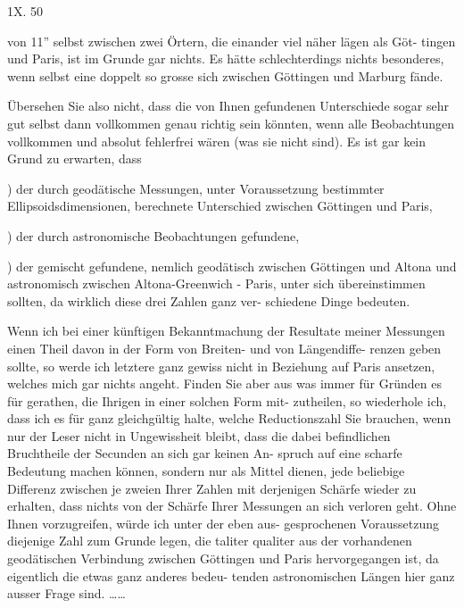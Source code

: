 \documentclass[12pt,a4paper]{article}
\theoremstyle{plain}
\theoremstyle{definition}
\theoremstyle{remark}
\begin{document}

\noindent
1X. 50

\noindent

\noindent
von 11'' selbst zwischen zwei Örtern, die einander viel näher lägen als Göt-
tingen und Paris, ist im Grunde gar nichts. Es hätte schlechterdings nichts
besonderes, wenn selbst eine doppelt so grosse sich zwischen Göttingen und
Marburg fände.

\noindent
Übersehen Sie also nicht, dass die von Ihnen gefundenen Unterschiede
sogar sehr gut selbst dann vollkommen genau richtig sein könnten, wenn
alle Beobachtungen vollkommen und absolut fehlerfrei wären (was sie nicht
sind). Es ist gar kein Grund zu erwarten, dass

) der durch geodätische Messungen, unter Voraussetzung bestimmter
Ellipsoidsdimensionen, berechnete Unterschied zwischen Göttingen und Paris,

) der durch astronomische Beobachtungen gefundene,

) der gemischt gefundene, nemlich geodätisch zwischen Göttingen und
Altona und astronomisch zwischen Altona-Greenwich - Paris,
unter sich übereinstimmen sollten, da wirklich diese drei Zahlen ganz ver-
schiedene Dinge bedeuten.

\noindent
Wenn ich bei einer künftigen Bekanntmachung der Resultate meiner
Messungen einen Theil davon in der Form von Breiten- und von Längendiffe-
renzen geben sollte, so werde ich letztere ganz gewiss nicht in Beziehung auf
Paris ansetzen, welches mich gar nichts angeht. Finden Sie aber aus was
immer für Gründen es für gerathen, die Ihrigen in einer solchen Form mit-
zutheilen, so wiederhole ich, dass ich es für ganz gleichgültig halte, welche
Reductionszahl Sie brauchen, wenn nur der Leser nicht in Ungewissheit bleibt,
dass die dabei befindlichen Bruchtheile der Secunden an sich gar keinen An-
spruch auf eine scharfe Bedeutung machen können, sondern nur als Mittel
dienen, jede beliebige Differenz zwischen je zweien Ihrer Zahlen mit derjenigen
Schärfe wieder zu erhalten, dass nichts von der Schärfe Ihrer Messungen an
sich verloren geht. Ohne Ihnen vorzugreifen, würde ich unter der eben aus-
gesprochenen Voraussetzung diejenige Zahl zum Grunde legen, die taliter
qualiter aus der vorhandenen geodätischen Verbindung zwischen Göttingen
und Paris hervorgegangen ist, da eigentlich die etwas ganz anderes bedeu-
tenden astronomischen Längen hier ganz ausser Frage sind. \ldots\ldots
\end{document}
